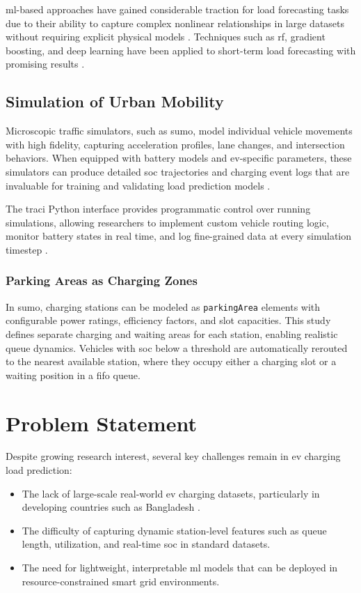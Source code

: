 \documentclass{thesis-library}
\begin{document}
\Gls{ml}-based approaches have gained considerable traction for load forecasting tasks
due to their ability to capture complex nonlinear relationships in large datasets without
requiring explicit physical models \cite{ml_ev_load2021}. Techniques such as \Gls{rf},
gradient boosting, and deep learning have been applied to short-term load forecasting
with promising results \cite{rf_load_forecast2020, xgboost_energy2022}.

\subsection{Simulation of Urban Mobility }

Microscopic traffic simulators, such as \Gls{sumo}, model individual vehicle movements
with high fidelity, capturing acceleration profiles, lane changes, and intersection
behaviors. When equipped with battery models and \Gls{ev}-specific parameters, these
simulators can produce detailed \Gls{soc} trajectories and charging event logs that are
invaluable for training and validating load prediction models \cite{sumo2018}.

The \Gls{traci} Python interface provides programmatic control over running simulations,
allowing researchers to implement custom vehicle routing logic, monitor battery states in
real time, and log fine-grained data at every simulation timestep \cite{traci2012}.

\subsubsection{Parking Areas as Charging Zones}

In \Gls{sumo}, charging stations can be modeled as \texttt{parkingArea} elements with
configurable power ratings, efficiency factors, and slot capacities. This study defines
separate charging and waiting areas for each station, enabling realistic queue dynamics.
Vehicles with \Gls{soc} below a threshold are automatically rerouted to the nearest
available station, where they occupy either a charging slot or a waiting position in a
\Gls{fifo} queue.

\section{Problem Statement}

Despite growing research interest, several key challenges remain in \Gls{ev} charging
load prediction:

\begin{itemize}
  \item The lack of large-scale real-world \Gls{ev} charging datasets, particularly in
        developing countries such as Bangladesh \cite{ev_bangladesh2023}.
  \item The difficulty of capturing dynamic station-level features such as queue length,
        utilization, and real-time \Gls{soc} in standard datasets.
  \item The need for lightweight, interpretable \Gls{ml} models that can be deployed in
        resource-constrained smart grid environments.
\end{itemize}
\end{document}
